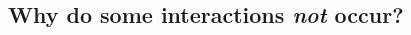\documentclass[12pt]{article}
\begin{document}
\begin{spacing}{2.0}






    \subsection*{Why do some interactions \emph{not} occur?}


\end{spacing}
\end{document}
